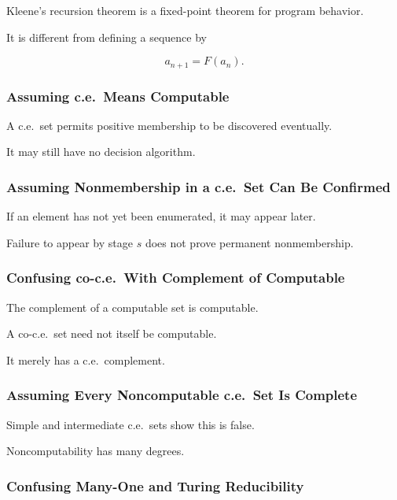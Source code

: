 Kleene's recursion theorem is a fixed-point theorem for program behavior.

It is different from defining a sequence by

\[
a_{n+1}=F(a_n).
\]

\subsubsection{Assuming c.e.\ Means Computable}

A c.e.\ set permits positive membership to be discovered eventually.

It may still have no decision algorithm.

\subsubsection{Assuming Nonmembership in a c.e.\ Set Can Be Confirmed}

If an element has not yet been enumerated, it may appear later.

Failure to appear by stage \(s\) does not prove permanent nonmembership.

\subsubsection{Confusing co-c.e.\ With Complement of Computable}

The complement of a computable set is computable.

A co-c.e.\ set need not itself be computable.

It merely has a c.e.\ complement.

\subsubsection{Assuming Every Noncomputable c.e.\ Set Is Complete}

Simple and intermediate c.e.\ sets show this is false.

Noncomputability has many degrees.

\subsubsection{Confusing Many-One and Turing Reducibility}

